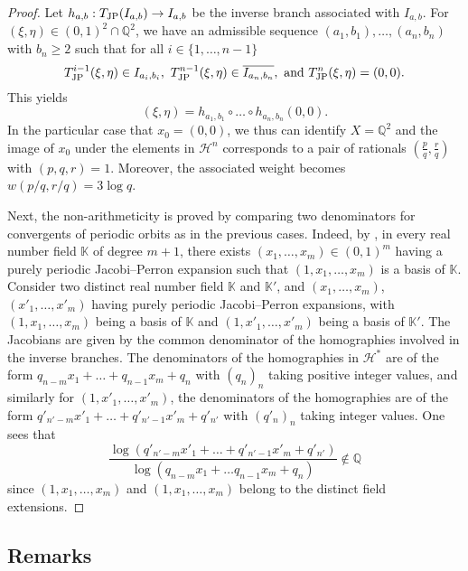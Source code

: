 \documentclass[12pt,a4paper,reqno]{amsart}
\begin{document}
\begin{proof}
Let $h_{a,b}:  T_{\rm JP}(I_{a,b}) \to I_{a,b}$ be the inverse branch associated with  $I_{a,b}$. For $(\xi, \eta) \in (0,1)^2 \cap \mathbb{Q}^2$, we have an admissible sequence $(a_1, b_1), \ldots , (a_n, b_n)$ with $b_n \geq 2$ such that for all $i \in \{1, \ldots, n-1\}$
\[ T_{\rm JP}^{i-1}(\xi, \eta) \in I_{a_i, b_i}, \ T_{\rm JP}^{n-1}(\xi, \eta) \in \overline{I_{a_n, b_n}},   \mbox{ and }
T_{\rm JP}^n(\xi, \eta)=(0, 0).\] This yields 
\[ (\xi, \eta)= h_{a_1, b_1} \circ \ldots \circ h_{a_n, b_n} (0, 0).
\]
In the particular case that $x_0=(0,0)$, we thus can identify $X = \mathbb Q^2$ and the image of $x_0$ under the elements in $\mathcal H^n$ corresponds to a pair of rationals $(\frac{p}{q}, \frac{r}{q})$ with $(p,q,r)=1$. Moreover, the associated weight becomes $w(p/q, r/q)=3 \log q$.


Next, the non-arithmeticity is proved by comparing two  denominators for   convergents  of   periodic orbits as in  the  previous cases.
Indeed, by \cite{PLRD},  in every real number field  ${\mathbb K}$ of degree $m+1$, there exists  $(x_1, \ldots,x_m) \in (0,1)^m$
having a purely periodic  Jacobi--Perron  expansion  such that $(1,x_1,\ldots,x_m)$ is a basis of ${\mathbb K}$.
Consider two   distinct real number field  ${\mathbb K}$  and  ${\mathbb K}'$, and $(x_1, \ldots,x_m) $, $(x'_1, \ldots,x'_m)$  having 
purely periodic  Jacobi--Perron  expansions,  with  $(1,x_1,\ldots,x_m)$ being  a basis of ${\mathbb K}$ and $(1,x'_1,\ldots,x'_m)$ being  a basis of ${\mathbb K}'$.
The  Jacobians  are  given by the common  denominator  of the   homographies involved  in the inverse branches.  The denominators  of the  homographies in ${\mathcal H}^*$ are of the form 
$ q_{n-m}  x_1  + \ldots  + q_{n-1} x_m +q_n$  with $(q_n)_n$  taking positive  integer  values,
and similarly  for   $(1,x'_1,\ldots,x'_m)$,  the denominators  of the  homographies   are  of the form 
$ q'_{n'-m}  x'_1  + \ldots  + q'_{n'-1} x'_m +q'_{n'}$  with $(q'_n)_n$  taking integer  values.
One sees that  
\[
\frac{\log  ( q'_{n'-m}  x'_1  + \ldots +q'_{n'-1} x'_m +q'_{n'})}{ \log  ( q_{n-m}  x_1  + \ldots q_{n-1} x_m +q_n)} \not \in {\mathbb Q}
\]
since  $(1,x_1,\ldots,x_m)$ and $(1,x_1,\ldots,x_m)$ belong to the distinct field extensions.
\end{proof}









\subsection{Remarks} \label{subsec:rem}
\end{document}

